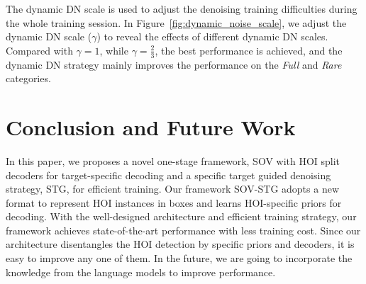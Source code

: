\documentclass[10pt,twocolumn,letterpaper]{article}
\begin{document}
\quad The dynamic DN scale is used to adjust the denoising training difficulties during the whole training session. 
In Figure~\ref{fig:dynamic_noise_scale}, we adjust the dynamic DN scale ($\gamma$) to reveal the effects of different dynamic DN scales.
Compared with $\gamma=1$, while $\gamma=\frac{2}{3}$, the best performance is achieved, and the dynamic DN strategy mainly improves the performance on the \textit{Full} and \textit{Rare} categories.

\section{Conclusion and Future Work}
In this paper, we proposes a novel one-stage framework, SOV with HOI split decoders for target-specific decoding and a specific target guided denoising strategy, STG, for efficient training.
Our framework SOV-STG adopts a new format to represent HOI instances in boxes and learns HOI-specific priors for decoding.
With the well-designed architecture and efficient training strategy, our framework achieves state-of-the-art performance with less training cost.
Since our architecture disentangles the HOI detection by specific priors and decoders, it is easy to improve any one of them.
In the future, we are going to incorporate the knowledge from the language models to improve performance.

{\small


}
\end{document}
